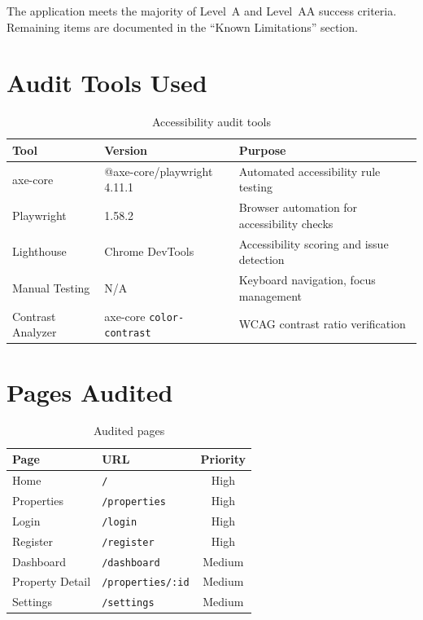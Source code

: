 \documentclass[12pt,a4paper]{article}
\begin{document}
\vspace{0.5em}
\noindent The application meets the majority of Level~A and Level~AA success criteria. Remaining items are documented in the ``Known Limitations'' section.

\section{Audit Tools Used}

\begin{table}[H]
\centering
\begin{tabularx}{\textwidth}{llX}
\toprule
\textbf{Tool} & \textbf{Version} & \textbf{Purpose} \\
\midrule
axe-core         & @axe-core/playwright 4.11.1 & Automated accessibility rule testing \\
Playwright       & 1.58.2                      & Browser automation for accessibility checks \\
Lighthouse       & Chrome DevTools             & Accessibility scoring and issue detection \\
Manual Testing   & N/A                         & Keyboard navigation, focus management \\
Contrast Analyzer& axe-core \texttt{color-contrast} & WCAG contrast ratio verification \\
\bottomrule
\end{tabularx}
\caption{Accessibility audit tools}
\end{table}

\section{Pages Audited}

\begin{table}[H]
\centering
\begin{tabular}{llc}
\toprule
\textbf{Page} & \textbf{URL} & \textbf{Priority} \\
\midrule
Home            & \texttt{/}              & High \\
Properties      & \texttt{/properties}    & High \\
Login           & \texttt{/login}         & High \\
Register        & \texttt{/register}      & High \\
Dashboard       & \texttt{/dashboard}     & Medium \\
Property Detail & \texttt{/properties/:id}& Medium \\
Settings        & \texttt{/settings}      & Medium \\
\bottomrule
\end{tabular}
\caption{Audited pages}
\end{table}
\end{document}
